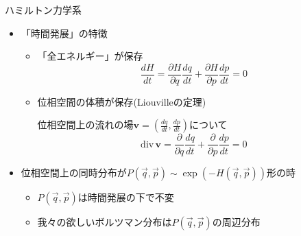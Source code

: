 
\begin{frame}[t,fragile]{ハミルトン力学系}
  \begin{itemize}
  \item 「時間発展」の特徴
  \begin{itemize}
    \item 「全エネルギー」が保存
    \[
      \frac{dH}{dt} = \frac{\partial H}{\partial q} \frac{dq}{dt} + \frac{\partial H}{\partial p} \frac{dp}{dt} = 0
    \]
    \item 位相空間の体積が保存(Liouvilleの定理)

          位相空間上の流れの場\(\bm{v} = (\frac{dq}{dt},\frac{dp}{dt})\)について
          \[
          \text{div} \, \bm{v} = \frac{\partial}{\partial q} \frac{dq}{dt} + \frac{\partial}{\partial p} \frac{dp}{dt} = 0
          \]
          \end{itemize}
  \item 位相空間上の同時分布が\(P(\vec{q},\vec{p}) \sim \exp(-H(\vec{q},\vec{p}))\)形の時
  \begin{itemize}
    \item \(P(\vec{q},\vec{p})\)は時間発展の下で不変
    \item 我々の欲しいボルツマン分布は\(P(\vec{q},\vec{p})\)の周辺分布
  \end{itemize}
\end{itemize}
\end{frame}
